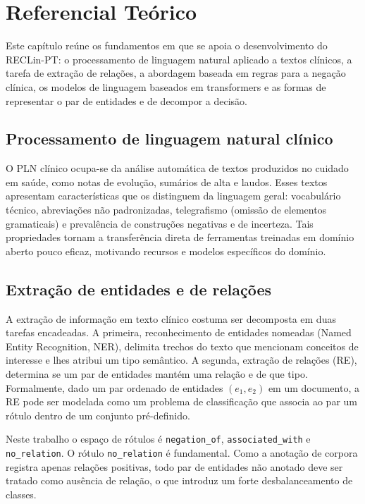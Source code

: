 \chapter[Referencial Teórico]{Referencial Teórico}
\label{cap:referencial}

Este capítulo reúne os fundamentos em que se apoia o desenvolvimento do RECLin-PT:
o processamento de linguagem natural aplicado a textos clínicos, a tarefa de
extração de relações, a abordagem baseada em regras para a negação clínica, os
modelos de linguagem baseados em \foreignlanguage{english}{transformers} e as formas
de representar o par de entidades e de decompor a decisão.

\section{Processamento de linguagem natural clínico}

O PLN clínico ocupa-se da análise automática de textos produzidos no cuidado em
saúde, como notas de evolução, sumários de alta e laudos. Esses textos
apresentam características que os distinguem da linguagem geral: vocabulário
técnico, abreviações não padronizadas, telegrafismo (omissão de elementos
gramaticais) e prevalência de construções negativas e de incerteza. Tais
propriedades tornam a transferência direta de ferramentas treinadas em domínio
aberto pouco eficaz, motivando recursos e modelos específicos do domínio.

\section{Extração de entidades e de relações}
\label{sec:re_tarefa}

A extração de informação em texto clínico costuma ser decomposta em duas
tarefas encadeadas. A primeira, reconhecimento de entidades nomeadas
(\foreignlanguage{english}{Named Entity Recognition}, NER), delimita trechos do
texto que mencionam conceitos de interesse e lhes atribui um tipo semântico. A
segunda, extração de relações (RE), determina se um par de entidades
mantém uma relação e de que tipo. Formalmente, dado um par ordenado de entidades
$(e_1, e_2)$ em um documento, a RE pode ser modelada como um problema de
classificação que associa ao par um rótulo dentro de um conjunto pré-definido.

Neste trabalho o espaço de rótulos é \texttt{negation\_of},
\texttt{associated\_with} e \texttt{no\_relation}. O rótulo
\texttt{no\_relation} é fundamental. Como a anotação de corpora registra apenas
relações positivas, todo par de entidades não anotado deve ser tratado como
ausência de relação, o que introduz um forte desbalanceamento de classes.

